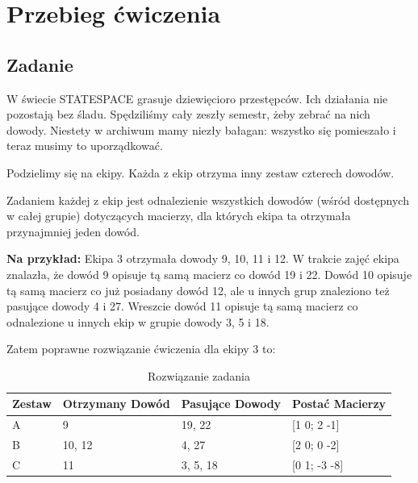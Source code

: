 \documentclass{sprawozdanie-agh}
\begin{document}

\stronatytulowa{}


\section{Przebieg ćwiczenia}
\subsection{Zadanie}

\par
W świecie STATESPACE grasuje dziewięcioro przestępców. Ich działania nie pozostają bez śladu. Spędziliśmy cały zeszły semestr, żeby zebrać na nich dowody. Niestety w archiwum mamy niezły bałagan: wszystko się pomieszało i teraz musimy to uporządkować.
\vspace{0.5cm}
\par
Podzielimy się na ekipy. Każda z ekip otrzyma inny zestaw czterech dowodów. 
\vspace{0.5cm}
\par
Zadaniem każdej z ekip jest odnalezienie wszystkich dowodów (wśród   dostępnych w całej grupie) dotyczących macierzy, dla których ekipa ta otrzymała przynajmniej jeden dowód.
\vspace{0.5cm}
\par
\textbf{Na przykład:}
Ekipa 3 otrzymała dowody 9, 10, 11 i 12. W trakcie zajęć ekipa znalazła, że dowód 9 opisuje tą samą macierz co dowód 19 i 22. Dowód 10 opisuje tą samą macierz co już posiadany dowód 12, ale u innych grup znaleziono też pasujące dowody 4 i 27. Wreszcie dowód 11 opisuje tą samą macierz co odnalezione u innych ekip w grupie dowody 3, 5 i 18.
\vspace{0.5cm}
\par
Zatem poprawne rozwiązanie ćwiczenia dla ekipy 3 to:
\begin{table}[h]
\caption{Rozwiązanie zadania}
\centering
\begin{tabular}{| m{2cm} | m{3cm}| m{3cm} | m{3cm} |}
\hline
Zestaw & Otrzymany Dowód & Pasujące Dowody & Postać Macierzy  \\
\hline
A      & 9               & 19, 22          & {[}1 0; 2 -1{]}  \\
\hline
B      & 10, 12          & 4, 27           & {[}2 0; 0 -2{]}  \\
\hline
C      & 11              & 3, 5, 18        & {[}0 1; -3 -8{]} \\
\hline
\end{tabular}
\label{tab:przyklad}
\end{table}
\end{document}
